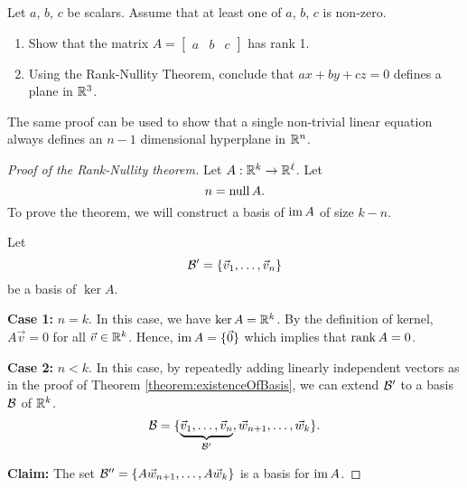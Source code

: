 \begin{qbox}
  Let $a$, $b$, $c$ be scalars. Assume that at least one of $a$, $b$, $c$ is non-zero.
  \begin{enumerate}
    \item Show that the matrix $A = \begin{bmatrix} a & b & c \end{bmatrix}$ has rank 1.
    \item Using the Rank-Nullity Theorem, conclude that $ax + by + cz = 0$ defines a plane in $\mathbb{R}^3$.
  \end{enumerate}
  The same proof can be used to show that a single non-trivial linear equation always defines an $n-1$ dimensional hyperplane in $\mathbb{R}^n$.
\end{qbox}


\begin{proof}[Proof of the Rank-Nullity theorem]
  Let $A: \mathbb{R}^k \rightarrow \mathbb{R}^\ell$. Let $$n = \operatorname{null} A.$$
  To prove the theorem, we will construct a basis of $\operatorname{im} A$ of size $k - n$.

  Let $$\mathcal{B}' = \left\{\vec{v}_1, \dots, \vec{v}_n\right\}$$ be a basis of $\ker A$.

  \textbf{Case 1:} $n = k$. In this case, we have $\ker A = \mathbb{R}^k$. By the definition of kernel, $A \vec{v} = 0$ for all $\vec{v} \in \mathbb{R}^k$. Hence, $\operatorname{im} A = \{ \vec{0} \}$ which implies that $\operatorname{rank} A = 0$.

  \textbf{Case 2:} $n < k$. In this case, by repeatedly adding linearly independent vectors as in the proof of Theorem \ref{theorem:existenceOfBasis}, we can extend $\mathcal{B}'$ to a basis $\mathcal{B}$ of $\mathbb{R}^k$.
  \begin{align*}
    \mathcal{B}=\{\underbrace{\vec{v}_1, \dots, \vec{v}_n}_{\mathcal{B}'}, \vec{w}_{n+1}, \dots, \vec{w}_k\}.
  \end{align*}

  \textbf{Claim:} The set $\mathcal{B}''  = \{A\vec{w}_{n+1}, \dots, A\vec{w}_k \}$ is a basis for $\operatorname{im} A$.


\end{proof}
